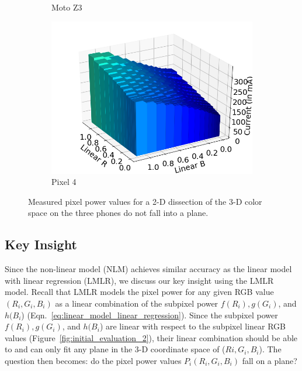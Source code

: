 \begin{figure}[tp]
\begin{subfigure}[]{0.28\textwidth}
		\caption{Moto Z3}
		\label{fig:initial_monotonicity_p2_w}
	\end{subfigure}
	\hfill
	\begin{subfigure}[]{0.28\textwidth}
		\includegraphics[width=\textwidth]{figure/004_Pixel4_monotonicity_cube.png}
		\caption{Pixel 4}
		\label{fig:initial_monotonicity_z3_w}
	\end{subfigure}
        \vspace{-0.1in}
	\caption{Measured pixel power values for a 2-D dissection of the 3-D color space on the three phones do not fall into a plane.}
\label{fig:initial_monotonicity}
\end{figure}


\subsection{Key Insight}

Since the non-linear model (NLM) achieves similar accuracy as the linear model
with linear regression (LMLR), we discuss our key insight using the
LMLR model.
Recall that LMLR models the pixel power for any given RGB value
$(R_i, G_i,B_i)$ as a linear combination of the subpixel power 
$f(R_{i}), g(G_i)$, and $h(B_i$) (Eqn.~\ref{eq:linear_model_linear_regression}).
Since the subpixel power $f(R_{i}), g(G_i)$, and $h(B_i$) are linear
with respect to the subpixel linear RGB values
(Figure~\ref{fig:initial_evaluation_2}), their linear combination
should be able to and can only fit any plane in the 3-D coordinate space of
($Ri, G_i, B_i$). The question then becomes: do the pixel power values
$P_i(R_i, G_i,B_i)$ fall on a plane?

